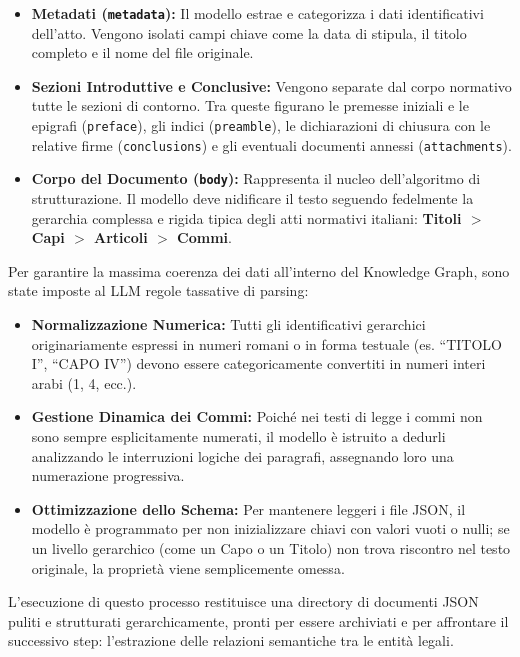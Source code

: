 \begin{itemize}
    \item \textbf{Metadati (\texttt{metadata}):} Il modello estrae e categorizza i dati identificativi dell'atto. Vengono isolati campi chiave come la data di stipula, il titolo completo e il nome del file originale.
    \item \textbf{Sezioni Introduttive e Conclusive:} Vengono separate dal corpo normativo tutte le sezioni di contorno. Tra queste figurano le premesse iniziali e le epigrafi (\texttt{preface}), gli indici (\texttt{preamble}), le dichiarazioni di chiusura con le relative firme (\texttt{conclusions}) e gli eventuali documenti annessi (\texttt{attachments}).
    \item \textbf{Corpo del Documento (\texttt{body}):} Rappresenta il nucleo dell'algoritmo di strutturazione. Il modello deve nidificare il testo seguendo fedelmente la gerarchia complessa e rigida tipica degli atti normativi italiani: \textbf{Titoli $>$ Capi $>$ Articoli $>$ Commi}.
\end{itemize}

Per garantire la massima coerenza dei dati all'interno del Knowledge Graph, sono state imposte al LLM regole tassative di parsing:

\begin{itemize}
    \item \textbf{Normalizzazione Numerica:} Tutti gli identificativi gerarchici originariamente espressi in numeri romani o in forma testuale (es. ``TITOLO I'', ``CAPO IV'') devono essere categoricamente convertiti in numeri interi arabi (1, 4, ecc.).
    \item \textbf{Gestione Dinamica dei Commi:} Poiché nei testi di legge i commi non sono sempre esplicitamente numerati, il modello è istruito a dedurli analizzando le interruzioni logiche dei paragrafi, assegnando loro una numerazione progressiva.
    \item \textbf{Ottimizzazione dello Schema:} Per mantenere leggeri i file JSON, il modello è programmato per non inizializzare chiavi con valori vuoti o nulli; se un livello gerarchico (come un Capo o un Titolo) non trova riscontro nel testo originale, la proprietà viene semplicemente omessa.
\end{itemize}

L'esecuzione di questo processo restituisce una directory di documenti JSON puliti e strutturati gerarchicamente, pronti per essere archiviati e per affrontare il successivo step: l'estrazione delle relazioni semantiche tra le entità legali.


